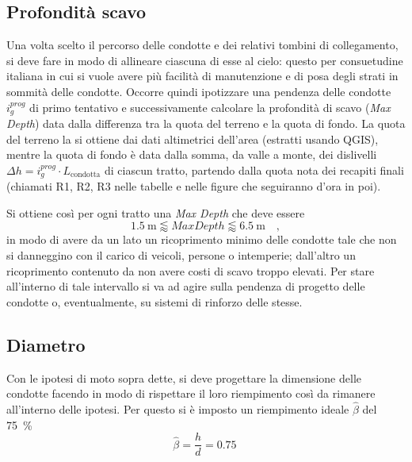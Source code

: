 \subsection{Profondità scavo}
Una volta scelto il percorso delle condotte e dei relativi tombini di collegamento, si deve fare in modo di allineare ciascuna di esse al cielo: 
questo per consuetudine italiana in cui si vuole avere più facilità di manutenzione e di posa degli strati in sommità delle condotte. 
Occorre quindi ipotizzare una pendenza delle condotte $i_g^{prog}$ di primo tentativo e successivamente calcolare la profondità di scavo (\emph{Max Depth}) data dalla differenza tra la quota del terreno e la quota di fondo.
La quota del terreno la si ottiene dai dati altimetrici dell'area (estratti usando QGIS), mentre la quota di fondo è data dalla somma, da valle a monte, dei dislivelli $\Delta h = i_g^{prog} \cdot L_{\text{condotta}}$ di ciascun tratto, partendo dalla quota nota dei recapiti finali (chiamati R1, R2, R3 nelle tabelle e nelle figure che seguiranno d'ora in poi).

Si ottiene così per ogni tratto una \emph{Max Depth} che deve essere
\begin{equation}
    \SI{1.5}{\metre} \lessapprox Max Depth \lessapprox\SI{6.5}{\metre}\quad ,
\end{equation} 
in modo di avere da un lato un ricoprimento minimo delle condotte tale che non si danneggino con il carico di veicoli, persone o intemperie;  dall'altro un ricoprimento contenuto da non avere costi di scavo troppo elevati. 
Per stare all'interno di tale intervallo si va ad agire sulla pendenza di progetto delle condotte o, eventualmente, su sistemi di rinforzo delle stesse.
\subsection{Diametro}
Con le ipotesi di moto sopra dette, si deve progettare la dimensione delle condotte facendo in modo di rispettare il loro riempimento così da rimanere all'interno delle ipotesi. 
Per questo si è imposto un riempimento ideale $\hat{\beta}$ del \SI{75}{\percent}
\begin{equation}
    \hat{\beta} = \frac{h}{d} = \SI{0.75}{}
\end{equation}

